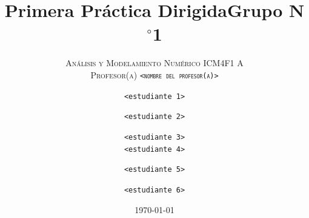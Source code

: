 


\title{
	\huge\sffamily\color{DarkBlue}
	Primera Práctica Dirigida\quad Grupo N$^{\circ}$1
}

\subtitle{
	\large\scshape\color{DarkBlue}
	Análisis y Modelamiento Numérico I\quad CM4F1 A\\[.5\baselineskip]
	\normalsize\normalfont
	Profesor(a) \texttt{<nombre del profesor(a)>}
}

\author{
	\texttt{<estudiante 1>}\qquad\and\qquad
	\texttt{<estudiante 2>}\qquad\and\qquad
	\texttt{<estudiante 3>}\\[\baselineskip]
	\texttt{<estudiante 4>}\qquad\and\qquad
	\texttt{<estudiante 5>}\qquad\and\qquad
	\texttt{<estudiante 6>}\\[\baselineskip]
}


\date{\today} %




